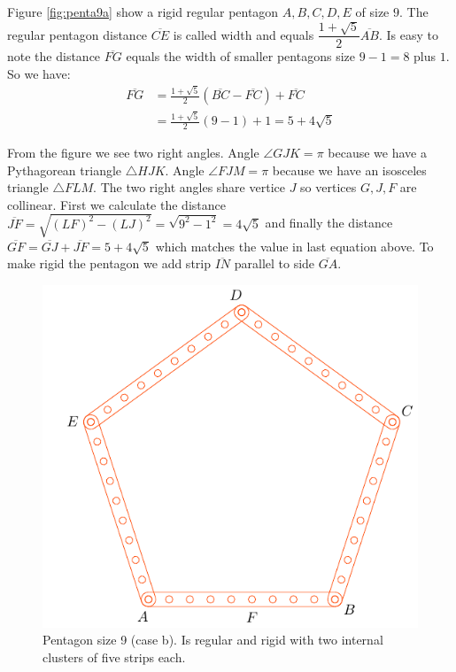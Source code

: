\documentclass[11pt]{article}
\begin{document}
Figure \ref{fig:penta9a} show a rigid regular pentagon $A,B,C,D,E$ of size $9$. The regular pentagon distance $\overline{CE}$ is called width and equals $\dfrac{1+\sqrt5}{2}\overline{AB}$. Is easy to note the distance $\overline{FG}$ equals the width of smaller pentagons size $9-1=8$ plus $1$. So we have:
\begin{align}
\overline{FG} &= \frac{1+\sqrt5}{2}(\overline{BC}-\overline{FC}) + \overline{FC}\nonumber\\
 &= \frac{1+\sqrt5}{2}(9-1) + 1 = 5 + 4\sqrt5
\end{align}

From the figure we see two right angles. Angle $\angle{GJK}=\pi$ because we have a Pythagorean triangle $\triangle{HJK}$. Angle $\angle{FJM}=\pi$ because we have an isosceles triangle $\triangle{FLM}$. The two right angles share vertice $J$ so vertices $G,J,F$ are collinear. First we calculate the distance $\overline{JF} = \sqrt{(LF)^2 - (LJ)^2} = \sqrt{9^2-1^2} = 4\sqrt5$ and finally the distance $\overline{GF} = \overline{GJ} + \overline{JF} = 5 + 4\sqrt5$ which matches the value in last equation above. To make rigid the pentagon we add strip $\overline{IN}$ parallel to side $\overline{GA}$.

\begin{figure}[H]
 \centering
 \includegraphics[scale=1]{9/penta9b}
 \caption{Pentagon size 9 (case b). Is regular and rigid with two internal clusters of five strips each.}
 \label{fig:penta9b}
\end{figure}
\end{document}
